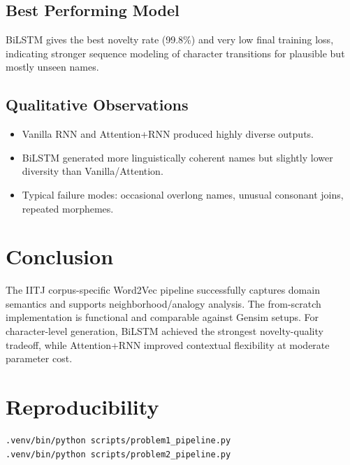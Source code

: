 \documentclass[11pt,a4paper]{article}
\begin{document}
\subsection{Best Performing Model}
BiLSTM gives the best novelty rate (99.8\%) and very low final training loss, indicating stronger sequence modeling of character transitions for plausible but mostly unseen names.

\subsection{Qualitative Observations}
\begin{itemize}
    \item Vanilla RNN and Attention+RNN produced highly diverse outputs.
    \item BiLSTM generated more linguistically coherent names but slightly lower diversity than Vanilla/Attention.
    \item Typical failure modes: occasional overlong names, unusual consonant joins, repeated morphemes.
\end{itemize}

\section{Conclusion}
The IITJ corpus-specific Word2Vec pipeline successfully captures domain semantics and supports neighborhood/analogy analysis. The from-scratch implementation is functional and comparable against Gensim setups. For character-level generation, BiLSTM achieved the strongest novelty-quality tradeoff, while Attention+RNN improved contextual flexibility at moderate parameter cost.

\section*{Reproducibility}
\begin{verbatim}
.venv/bin/python scripts/problem1_pipeline.py
.venv/bin/python scripts/problem2_pipeline.py
\end{verbatim}
\end{document}
